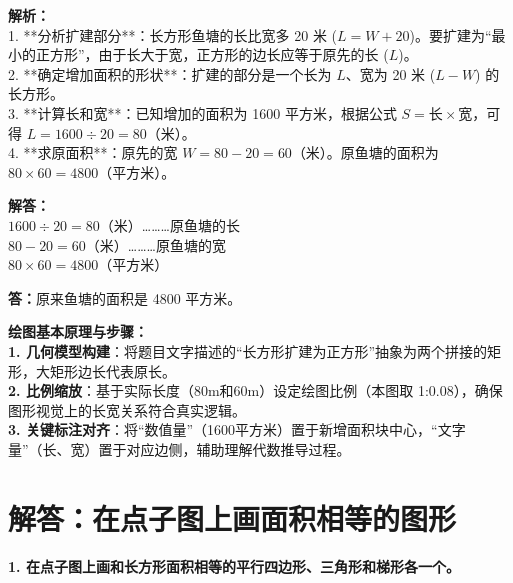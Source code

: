 \vspace{0.6cm}

{\small\color{gray}
\textbf{解析：}\\
1. **分析扩建部分**：长方形鱼塘的长比宽多 20 米 ($L = W + 20$)。要扩建为“最小的正方形”，由于长大于宽，正方形的边长应等于原先的长 ($L$)。\\
2. **确定增加面积的形状**：扩建的部分是一个长为 $L$、宽为 20 米 ($L - W$) 的长方形。\\
3. **计算长和宽**：已知增加的面积为 1600 平方米，根据公式 $S = \text{长} \times \text{宽}$，可得 $L = 1600 \div 20 = 80$（米）。\\
4. **求原面积**：原先的宽 $W = 80 - 20 = 60$（米）。原鱼塘的面积为 $80 \times 60 = 4800$（平方米）。
}

\vspace{0.4cm}
\noindent\textbf{解答：}\\
\indent $1600 \div 20 = 80$（米）\dots\dots\dots 原鱼塘的长\\
\indent $80 - 20 = 60$（米）\dots\dots\dots 原鱼塘的宽\\
\indent $80 \times 60 = 4800$（平方米）

\vspace{0.2cm}
\noindent\textbf{答：}原来鱼塘的面积是 4800 平方米。

\vspace{0.6cm}

{\small\color{blue!70!black}
\textbf{绘图基本原理与步骤：}\\
\textbf{1. 几何模型构建}：将题目文字描述的“长方形扩建为正方形”抽象为两个拼接的矩形，大矩形边长代表原长。\\
\textbf{2. 比例缩放}：基于实际长度（80m和60m）设定绘图比例（本图取 1:0.08），确保图形视觉上的长宽关系符合真实逻辑。\\
\textbf{3. 关键标注对齐}：将“数值量”（1600平方米）置于新增面积块中心，“文字量”（长、宽）置于对应边侧，辅助理解代数推导过程。
}


\newpage




\section{解答：在点子图上画面积相等的图形}

\vspace{0.4cm}

\noindent\textbf{1. 在点子图上画和长方形面积相等的平行四边形、三角形和梯形各一个。}

\vspace{1.2cm}

